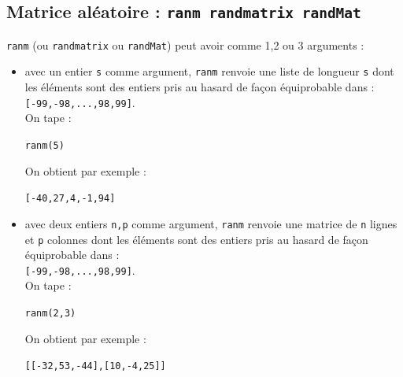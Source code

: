 \documentclass[a4paper,11pt]{book}
\begin{document}
\subsection{Matrice al\'eatoire : {\tt ranm randmatrix randMat}}
{\tt ranm} (ou {\tt randmatrix} ou {\tt randMat}) peut avoir comme 1,2 ou 3 
arguments :\\
\begin{itemize}
\item avec un entier {\tt s} comme argument, {\tt ranm} renvoie 
une liste de longueur {\tt s} dont les \'el\'ements sont des entiers pris au 
hasard de fa\c{c}on \'equiprobable dans :\\
 {\tt [-99,-98,...,98,99]}.\\
On tape :
\begin{center}{\tt ranm(5)}\end{center}
On obtient par exemple :
\begin{center}{\tt [-40,27,4,-1,94]}\end{center}

\item avec deux entiers {\tt n,p} comme argument, {\tt ranm} renvoie une 
matrice de {\tt n} lignes et {\tt p} colonnes dont les \'el\'ements sont des 
entiers pris au hasard de fa\c{c}on \'equiprobable dans :\\
 {\tt [-99,-98,...,98,99]}.\\
On tape :
\begin{center}{\tt ranm(2,3)}\end{center}
On obtient par exemple :
\begin{center}{\tt [[-32,53,-44],[10,-4,25]]}\end{center}


\end{itemize}
\end{document}
